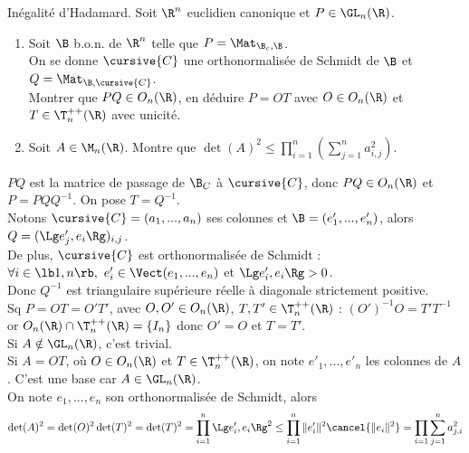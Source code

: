 \documentclass[11pt]{article}
\begin{document}
\begin{exercice}{Inégalité d'Hadamard.}{}
    Soit $\R^n$ euclidien canonique et $P\in\GL_n(\R)$.
    \begin{enumerate}
        \item Soit $\B$ b.o.n. de $\R^n$ telle que $P=\Mat_{\B_c,\B}$.\\
        On se donne $\cursive{C}$ une orthonormalisée de Schmidt de $\B$ et $Q=\Mat_{\B,\cursive{C}}$.\\
        Montrer que $PQ \in O_n(\R)$, en déduire $P=OT$ avec $O\in O_n(\R)$ et $T\in\T_n^{++}(\R)$ avec unicité.
        \item Soit $A\in\M_n(\R)$. Montre que $\det(A)^2 \leq \prod_{i=1}^n \left( \sum_{j=1}^n a_{i,j}^2 \right)$.
    \end{enumerate}
    \tcblower
     $PQ$ est la matrice de passage de $\B_C$ à $\cursive{C}$, donc $PQ\in O_n(\R)$ et $P=PQQ^{-1}$. On pose $T=Q^{-1}$.\\
    Notons $\cursive{C}=(a_1,...,a_n)$ ses colonnes et $\B=(e'_1,...,e'_n)$, alors $Q=(\Lg e'_j, e_i\Rg)_{i,j}$.\\
    De plus, $\cursive{C}$ est orthonormalisée de Schmidt : $\forall i \in \lb1,n\rb, ~ e'_i \in \Vect(e_1,...,e_n)$ et $\Lg e'_i,e_i\Rg>0$.\\
    Donc $Q^{-1}$ est triangulaire supérieure réelle à diagonale strictement positive.\\
    Sq $P=OT=O'T'$, avec $O,O'\in O_n(\R)$, $T,T'\in\T_n^{++}(\R)$ : $(O')^{-1}O=T'T^{-1}$ or $O_n(\R)\cap\T_n^{++}(\R)=\{ I_n\}$ donc $O'=O$ et $T=T'$.\\
     Si $A\notin \GL_n(\R)$, c'est trivial.\\
    Si $A=OT$, où $O\in O_n(\R)$ et $T\in \T_n^{++}(\R)$, on note $e'_1,...,e'_n$ les colonnes de $A$. C'est une base car $A\in\GL_n(\R)$.\\
    On note $e_1,...,e_n$ son orthonormalisée de Schmidt, alors \begin{equation*}\det(A)^2=\det(O)^2\det(T)^2=\det(T)^2=\prod_{i=1}^n\Lg e'_i, e_i\Rg^2 \leq \prod_{i=1}^n \|e'_i\|^2\cancel{\|e_i\|^2}=\prod_{i=1}\sum_{j=1}^n a_{j,i}^2\end{equation*}
\end{exercice}

\vspace*{-0.8cm}
\end{document}
